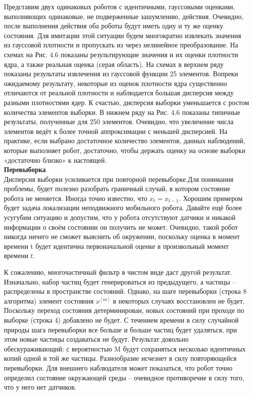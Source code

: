 \documentclass[10pt,a4paper]{article}
\begin{document}
Представим двух одинаковых роботов с идентичными, гауссовыми оценками, выполняющих одинаковые, не подверженные зашумлению, действия. Очевидно, после выполнения действия оба роботы будут иметь одну и ту же оценку состояния. Для имитации этой ситуации будем многократно извлекать значения из гауссовой плотности и пропускать из через нелинейное преобразование. На схемах на Рис. 4.6 показаны результирующие значения и их оценки плотности ядра, а также реальная оценка (серая область). На схемах в верхнем ряду показаны результаты извлечения  из гауссовой функции 25 элементов.
Вопреки ожидаемому результату, некоторые из оценок плотности ядра существенно отличаются от реальной плотности и наблюдается большая дисперсия между разными плотностями ядер. К счастью, дисперсия выборки уменьшается с ростом количества элементов выборки. В нижнем ряду на Рис. 4.6 показаны типичные результаты, полученные для 250 элементов. Очевидно, что увеличение числа элементов ведёт к более точной аппроксимации с меньшей дисперсией. На практике, если выбрано достаточное количество элементов, данных наблюдений, которые выполняет робот, достаточно, чтобы держать оценку на основе выборки «достаточно близко» к настоящей.\\

\textbf{Перевыборка }\\

Дисперсия выборки усиливается при повторной перевыборке.Для понимания проблемы, будет полезно разобрать граничный случай, в котором состояние робота не меняется. Иногда точно известно, что $x_t = x_{t-1}$. Хорошим примером будет задача локализации неподвижного мобильного робота. Давайте ещё более усугубим ситуацию и допустим, что у робота отсутствуют датчики и никакой информации о своём состоянии он получить не может. Очевидно, такой робот никогда ничего не  сможет выяснить об окружении, поскольку оценка в момент времени t будет идентична первоначальной оценке в произвольный  момент времени $t$.

К сожалению, многочастичный фильтр в чистом виде даст другой результат. Изначально, набор частиц будет генерироваться из предыдущего, а частицы – распределены в пространстве состояний. Однако, на шаге перевыборки (строка 8 алгоритма) элемент состояния $x^{[m]}$ в некоторых случаях восстановлен не будет. Поскольку переход состояния детерминирован, новых состояний при проходе по выборке (строка 4) добавлено не будет. С течением времени в силу случайной природы шага перевыборки все больше и больше частиц будет удаляться, при этом новые частицы создаваться не будут. Результат довольно обескураживающий: с вероятностью M будут сохраняться несколько идентичных копий одной и той же частицы. Разнообразие исчезнет в силу повторяющейся перевыборки. Для внешнего наблюдателя может показаться, что робот точно определил состояние окружающей среды – очевидное противоречие в силу того, что у него нет датчиков. 
\end{document}
